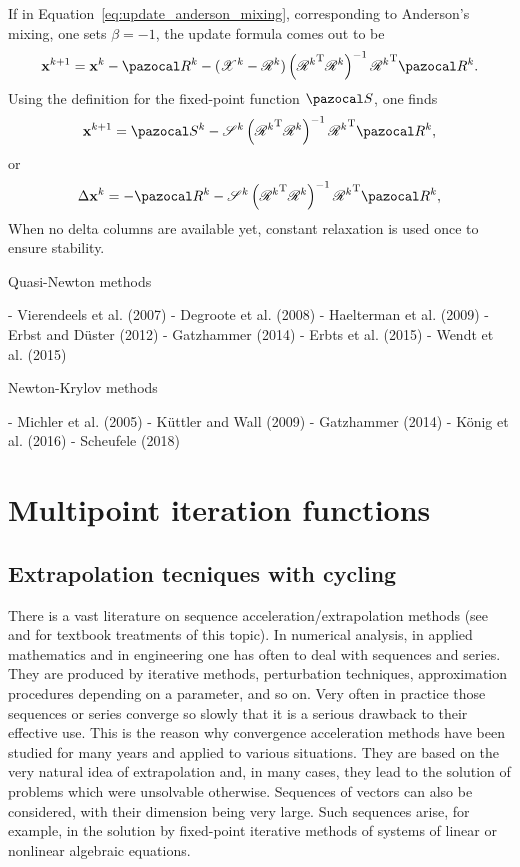 If in Equation~\eqref{eq:update_anderson_mixing}, corresponding to Anderson's mixing, one sets \(\beta=-1\), the update formula comes out to be
\begin{equation}
  \mathbf x^{k+1} = \mathbf x^k - \pazocal R^k - (\mathscr X^k - \mathscr R^k)\left({\mathscr{R}^{k}}^{\mathrm{T}} \mathscr{R}^{k}\right)^{-1} {\mathscr{R}^{k}}^{\mathrm{T}} \pazocal R^{k}.
\end{equation}
Using the definition for the fixed-point function \(\pazocal S\), one finds
\begin{equation}
  \mathbf x^{k+1} = \pazocal S^k - \mathscr S^k\left({\mathscr{R}^{k}}^{\mathrm{T}} \mathscr{R}^{k}\right)^{-1} {\mathscr{R}^{k}}^{\mathrm{T}} \pazocal R^{k},
\end{equation}
or
\begin{equation}
  \Delta \mathbf x^{k} = - \pazocal R^k - \mathscr S^k\left({\mathscr{R}^{k}}^{\mathrm{T}} \mathscr{R}^{k}\right)^{-1} {\mathscr{R}^{k}}^{\mathrm{T}} \pazocal R^{k},
\end{equation}
When no delta columns are available yet, constant relaxation is used once to ensure stability.

 Quasi-Newton methods

- Vierendeels et al. (2007)
- Degroote et al. (2008)
- Haelterman et al. (2009)
- Erbst and Düster (2012)
- Gatzhammer (2014)
- Erbts et al. (2015)
- Wendt et al. (2015)

 Newton-Krylov methods

- Michler et al. (2005)
- Küttler and Wall (2009)
- Gatzhammer (2014)
- König et al. (2016)
- Scheufele (2018)


\section{Multipoint iteration functions}

\subsection{Extrapolation tecniques with cycling}

There is a vast literature on sequence acceleration/extrapolation methods (see  \cite{brezinski_extrapolation_2013} and \cite{sidi_vector_2017} for textbook treatments of this topic).
In numerical analysis, in applied mathematics and in engineering one has often to deal with sequences and series. 
They are produced by iterative methods, perturbation techniques, approximation procedures depending on a parameter, and so on. 
Very often in practice those sequences or series converge so slowly that it is a serious drawback to their effective use. 
This is the reason why convergence acceleration methods have been studied for many years and applied to various situations. 
They are based on the very natural idea of extrapolation and, in many cases, they lead to the solution of problems which were unsolvable otherwise.
Sequences of vectors can also be considered, with their dimension being very large. 
Such sequences arise, for example, in the solution by fixed-point iterative methods of systems of linear or nonlinear algebraic equations. 

